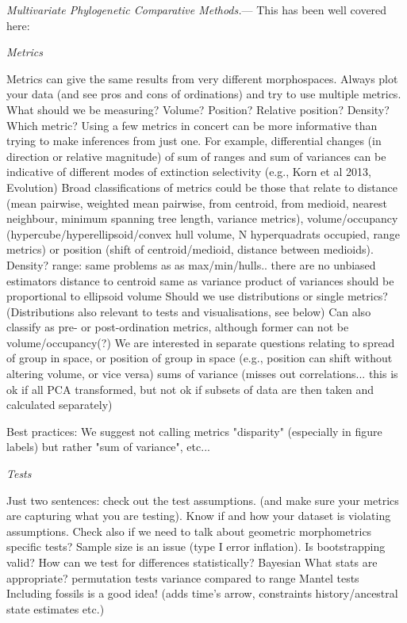 \documentclass[12pt,letterpaper]{article}
\renewcommand{\subsection}[1]{%
\bigskip
\begin{center}
\begin{large}
\normalfont\itshape #1
\end{large}
\end{center}}
\renewcommand{\subsubsection}[1]{%
\vspace{2ex}
\noindent
\textit{#1.}---}
\begin{document}
\subsubsection{Multivariate Phylogenetic Comparative Methods}
This has been well covered here: %



\subsection{Metrics}
\label{metrics}
Metrics can give the same results from very different morphospaces. Always plot your data (and see pros and cons of ordinations) and try to use multiple metrics.
What should we be measuring? Volume? Position? Relative position? Density? Which metric? Using a few metrics in concert can be more informative than trying to make inferences from just one. For example, differential changes (in direction or relative magnitude) of sum of ranges and sum of variances can be indicative of different modes of extinction selectivity (e.g., Korn et al 2013, Evolution)
Broad classifications of metrics could be those that relate to distance (mean pairwise, weighted mean pairwise, from centroid, from medioid, nearest neighbour, minimum spanning tree length, variance metrics), volume/occupancy (hypercube/hyperellipsoid/convex hull volume, N hyperquadrats occupied, range metrics) or position (shift of centroid/medioid, distance between medioids). Density?
range: same problems as as max/min/hulls.. there are no unbiased estimators
distance to centroid same as variance
product of variances should be proportional to ellipsoid volume
Should we use distributions or single metrics? (Distributions also relevant to tests and visualisations, see below)
Can also classify as pre- or post-ordination metrics, although former can not be volume/occupancy(?)
We are interested in separate questions relating to spread of group in space, or position of group in space (e.g., position can shift without altering volume, or vice versa)
sums of variance (misses out correlations... this is ok if all PCA transformed, but not ok if subsets of data are then taken and calculated separately)


Best practices:
We suggest not calling metrics "disparity" (especially in figure labels) but rather "sum of variance", etc...

\subsection{Tests}
Just two sentences: check out the test assumptions. (and make sure your metrics are capturing what you are testing). Know if and how your dataset is violating assumptions. Check also if we need to talk about geometric morphometrics specific tests?
Sample size is an issue (type I error inflation).
Is bootstrapping valid?
How can we test for differences statistically?
Bayesian
What stats are appropriate?
permutation tests
variance compared to range
Mantel tests
Including fossils is a good idea! (adds time’s arrow, constraints history/ancestral state estimates etc.)
\end{document}
